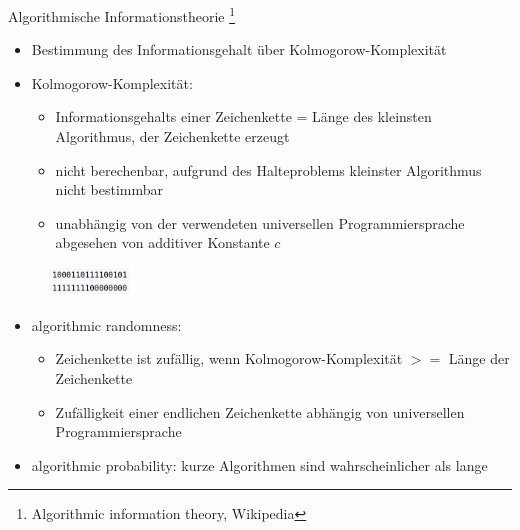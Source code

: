 \documentclass[aspectratio=1610, 9pt]{beamer}
\begin{document}
\begin{frame}{Algorithmische Informationstheorie \footnote[6]{Algorithmic information theory, Wikipedia}}
  \begin{itemize}
    \item Bestimmung des Informationsgehalt über Kolmogorow-Komplexität
    \item Kolmogorow-Komplexität:
    \begin{itemize}
      \item Informationsgehalts einer Zeichenkette = Länge des kleinsten Algorithmus, der Zeichenkette erzeugt
      \item nicht berechenbar, aufgrund des Halteproblems kleinster Algorithmus nicht bestimmbar
      \item unabhängig von der verwendeten universellen Programmiersprache abgesehen von additiver Konstante $c$
    \end{itemize}
  \end{itemize}
  \begin{figure}
    \includegraphics[width=0.2\textwidth]{images/kolmo.png}
  \end{figure}
  \begin{itemize}
    \item algorithmic randomness:
    \begin{itemize}
      \item Zeichenkette ist zufällig, wenn Kolmogorow-Komplexität $>=$ Länge der Zeichenkette
      \item Zufälligkeit einer endlichen Zeichenkette abhängig von universellen Programmiersprache
    \end{itemize}
    \item algorithmic probability: kurze Algorithmen sind wahrscheinlicher als lange
  \end{itemize}
\end{frame}
\end{document}
